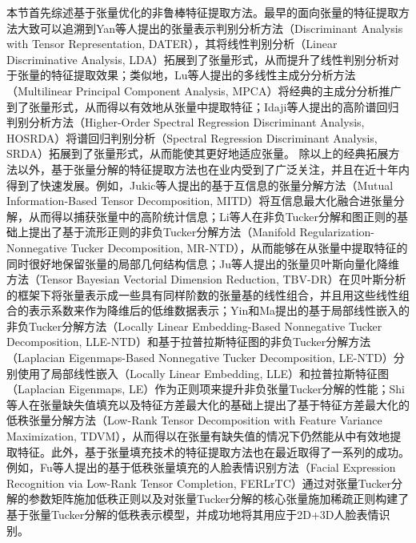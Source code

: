 
本节首先综述基于张量优化的非鲁棒特征提取方法。最早的面向张量的特征提取方法大致可以追溯到Yan等人提出的张量表示判别分析方法（Discriminant Analysis with Tensor Representation, DATER），其将线性判别分析（Linear Discriminative Analysis, LDA）拓展到了张量形式，从而提升了线性判别分析对于张量的特征提取效果；类似地，Lu等人提出的多线性主成分分析方法（Multilinear Principal Component Analysis, MPCA）将经典的主成分分析推广到了张量形式，从而得以有效地从张量中提取特征；Idaji等人提出的高阶谱回归判别分析方法（Higher-Order Spectral Regression Discriminant Analysis, HOSRDA）将谱回归判别分析（Spectral Regression Discriminant Analysis, SRDA）拓展到了张量形式，从而能使其更好地适应张量。
除以上的经典拓展方法以外，基于张量分解的特征提取方法也在业内受到了广泛关注，并且在近十年内得到了快速发展。例如，Jukic等人提出的基于互信息的张量分解方法（Mutual Information-Based Tensor Decomposition, MITD）将互信息最大化融合进张量分解，从而得以捕获张量中的高阶统计信息；Li等人在非负Tucker分解和图正则的基础上提出了基于流形正则的非负Tucker分解方法（Manifold Regularization-Nonnegative Tucker Decomposition, MR-NTD），从而能够在从张量中提取特征的同时很好地保留张量的局部几何结构信息；Ju等人提出的张量贝叶斯向量化降维方法（Tensor Bayesian Vectorial Dimension Reduction, TBV-DR）在贝叶斯分析的框架下将张量表示成一些具有同样阶数的张量基的线性组合，并且用这些线性组合的表示系数来作为降维后的低维数据表示；Yin和Ma提出的基于局部线性嵌入的非负Tucker分解方法（Locally Linear Embedding-Based Nonnegative Tucker Decomposition, LLE-NTD）和基于拉普拉斯特征图的非负Tucker分解方法（Laplacian Eigenmaps-Based Nonnegative Tucker Decomposition, LE-NTD）分别使用了局部线性嵌入（Locally Linear Embedding, LLE）和拉普拉斯特征图（Laplacian Eigenmaps, LE）作为正则项来提升非负张量Tucker分解的性能；Shi等人在张量缺失值填充以及特征方差最大化的基础上提出了基于特征方差最大化的低秩张量分解方法（Low-Rank Tensor Decomposition with Feature Variance Maximization, TDVM），从而得以在张量有缺失值的情况下仍然能从中有效地提取特征。此外，基于张量填充技术的特征提取方法也在最近取得了一系列的成功。例如，Fu等人提出的基于低秩张量填充的人脸表情识别方法（Facial Expression Recognition via Low-Rank Tensor Completion, FERLrTC）通过对张量Tucker分解的参数矩阵施加低秩正则以及对张量Tucker分解的核心张量施加稀疏正则构建了基于张量Tucker分解的低秩表示模型，并成功地将其用应于2D+3D人脸表情识别。

